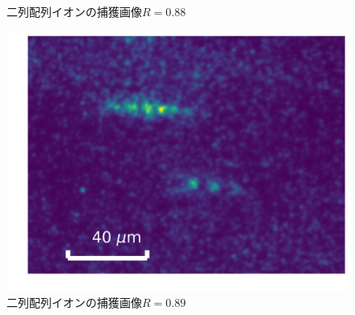 \begin{figure}[h]
\begin{minipage}{0.33\linewidth}
\begin{center}
			\caption{二列配列イオンの捕獲画像$R = 0.88$}
			\label{fig:2D_088}
		\end{center}
	\end{minipage}
	\begin{minipage}{0.33\linewidth}
		\begin{center}
			\includegraphics[width = 0.8\columnwidth]{./results/figure/2D_088_1.jpg}
			\caption{二列配列イオンの捕獲画像$R = 0.89$}
			\label{fig:2D_089}
		\end{center}
	\end{minipage}
\end{figure}

